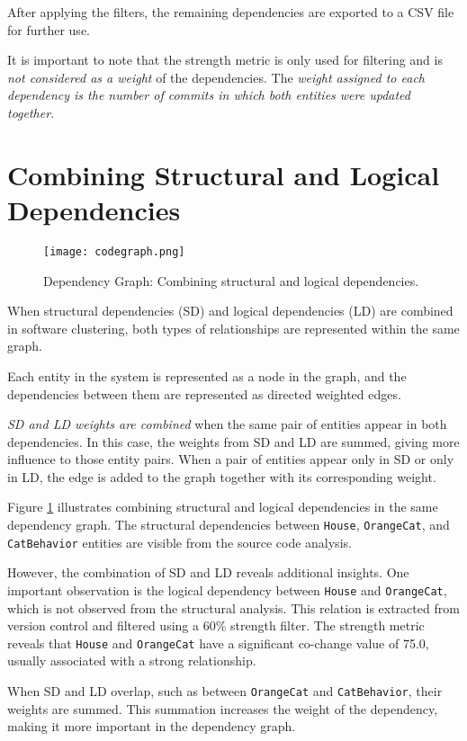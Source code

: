 After applying the filters, the remaining dependencies are exported to a CSV file for further use.

It is important to note that the strength metric is only used for filtering and is \textit{not considered as a weight} of the dependencies. The \textit{weight assigned to each dependency is the number of commits in which both entities were updated together}.


\section{Combining Structural and Logical Dependencies}


\begin{figure}[t!]
  \centering
  \texttt{[image: codegraph.png]}
  \caption{Dependency Graph: Combining structural and logical dependencies.}
  \label{fig:codegraph}
\end{figure}

When structural dependencies (SD) and logical dependencies (LD) are combined in software clustering, both types of relationships are represented within the same graph.

Each entity in the system is represented as a node in the graph, and the dependencies between them are represented as directed weighted edges.

\textit{SD and LD weights are combined} when the same pair of entities appear in both dependencies. In this case, the weights from SD and LD are summed, giving more influence to those entity pairs. When a pair of entities appear only in SD or only in LD, the edge is added to the graph together with its corresponding weight.

Figure \ref{fig:codegraph} illustrates combining structural and logical dependencies in the same dependency graph. The structural dependencies between \texttt{House}, \texttt{OrangeCat}, and \texttt{CatBehavior} entities are visible from the source code analysis.

However, the combination of SD and LD reveals additional insights. One important observation is the logical dependency between \texttt{House} and \texttt{OrangeCat}, which is not observed from the structural analysis. This relation is extracted from version control and filtered using a 60\% strength filter. The strength metric reveals that \texttt{House} and \texttt{OrangeCat} have a significant co-change value of 75.0, usually associated with a strong relationship.

When SD and LD overlap, such as between \texttt{OrangeCat} and \texttt{CatBehavior}, their weights are summed. This summation increases the weight of the dependency, making it more important in the dependency graph.

